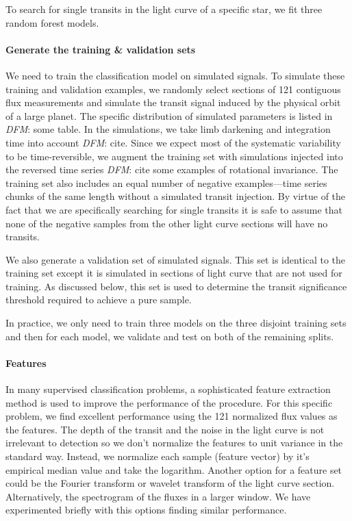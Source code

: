 \documentclass[12pt,preprint]{aastex}
\newcommand{\todo}[3]{{\color{#2}\emph{#1}: #3}}
\newcommand{\dfmtodo}[1]{\todo{DFM}{red}{#1}}
\begin{document}
To search for single transits in the light curve of a specific star, we fit
three random forest models.

\paragraph{Generate the training \& validation sets}

We need to train the classification model on simulated signals.
To simulate these training and validation examples, we randomly select
sections of 121 contiguous flux measurements and simulate the transit signal
induced by the physical orbit of a large planet.
The specific distribution of simulated parameters is listed in \dfmtodo{some
table}.
In the simulations, we take limb darkening and integration time into account
\dfmtodo{cite}.
Since we expect most of the systematic variability to be time-reversible, we
augment the training set with simulations injected into the reversed time
series \dfmtodo{cite some examples of rotational invariance}.
The training set also includes an equal number of negative examples---time
series chunks of the same length without a simulated transit injection.
By virtue of the fact that we are specifically searching for single transits
it is safe to assume that none of the negative samples from the other light
curve sections will have no transits.

We also generate a validation set of simulated signals.
This set is identical to the training set except it is simulated in sections
of light curve that are not used for training.
As discussed below, this set is used to determine the transit significance
threshold required to achieve a pure sample.

In practice, we only need to train three models on the three disjoint
training sets and then for each model, we validate and test on both of the
remaining splits.


\paragraph{Features}

In many supervised classification problems, a sophisticated feature
extraction method is used to improve the performance of the procedure.
For this specific problem, we find excellent performance using the 121
normalized flux values as the features.
The depth of the transit and the noise in the light curve is not irrelevant
to detection so we don't normalize the features to unit variance in the
standard way.
Instead, we normalize each sample (feature vector) by it's empirical median
value and take the logarithm.
Another option for a feature set could be the Fourier transform or wavelet
transform of the light curve section.
Alternatively, the spectrogram of the fluxes in a larger window.
We have experimented briefly with this options finding similar performance.
\end{document}
